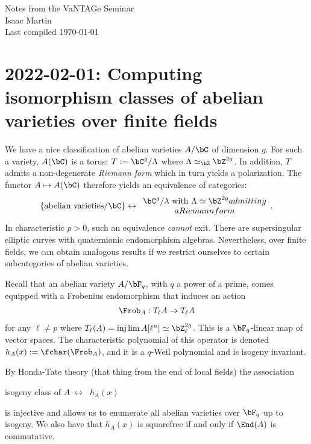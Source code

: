 


\pagestyle{empty}
	\LARGE
\begin{center}
	Notes from the VaNTAGe Seminar \\
	\Large
	Isaac Martin \\
    Last compiled \today
\end{center}
\normalsize
\vspace{-2mm}
\hru

\tableofcontents
\newpage

\section{2022-02-01: Computing isomorphism classes of abelian varieties over finite fields}

We have a nice classification of abelian varieties $A/\bC$ of dimension $g$. For such a variety, $A(\bC)$ is a torus: $T:= \bC^g/\Lambda$ where $\Lambda \simeq_\bZ \bZ^{2g}$. In addition, $T$ admits a non-degenerate \emph{Riemann form} which in turn yields a polarization. The functor $A \mapsto A(\bC)$ therefore yields an equivalence of categories:
\begin{align*}
	\left\{\text{abelian varieties}/\bC\right\} \leftrightarrow
	\begin{array}{c}
		\bC^g/\lambda \text{ with } \Lambda \simeq \bZ^{2g} admitting \\
		a Riemann form
	\end{array}.
\end{align*}
In characteristic $p >0$, such an equivalence \emph{cannot} exit. There are supersingular elliptic curves with quaternionic endomorphism algebras. Nevertheless, over finite fields, we can obtain analogous results if we restrict ourselves to certain subcategories of abelian varieties.

Recall that an abelian variety $A/\bF_q$, with $q$ a power of a prime, comes equipped with a Frobenius endomorphism that induces an action
\begin{align*}
	\Frob_A:T_\ell A\to T_\ell A
\end{align*}
for any $\ell \neq p$ where $T_\ell(A) = \injlim A[\ell^n] \simeq \bZ^{2g}_\ell$. This is a $\bF_q$-linear map of vector spaces. The characteristic polynomial of this operator is denoted $h_A(x):= \fchar(\Frob_A)$, and it is a $q$-Weil polynomial and is isogeny invariant.

By Honda-Tate theory (that thing from the end of local fields) the association
\begin{center}
	isogeny class of $A ~ \leftrightarrow ~$ $h_A(x)$
\end{center}
is injective and allows us to enumerate all abelian varieties over $\bF_q$ up to isogeny. We also have that $h_A(x)$ is squarefree if and only if $\End(A)$ is commutative. 


